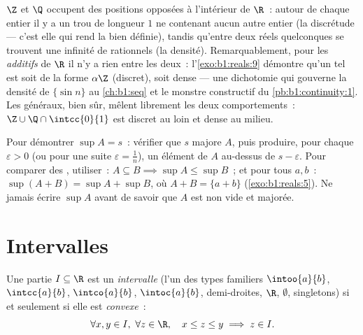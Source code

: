 \begin{remark}
$\Z$ et $\Q$ occupent des positions opposées à l'intérieur de
$\R$~: autour de chaque entier il y a un trou de longueur $1$ ne
contenant aucun autre entier (la discrétude --- c'est elle qui rend
la  bien définie), tandis qu'entre deux réels
quelconques se trouvent une infinité de rationnels (la densité).
Remarquablement, pour les \emph{ additifs} de $\R$ il
n'y a rien entre les deux~: l'\cref{exo:b1:reals:9} démontre qu'un
tel  est soit de la forme $\alpha\Z$ (discret), soit
dense --- une dichotomie qui gouverne la densité de $\{\sin n\}$ au
\cref{ch:b1:seq} et le monstre constructif du
\cref{pb:b1:continuity:1}. Les  généraux, bien sûr, mêlent
librement les deux comportements~: $\Z \cup \Q\cap\intcc{0}{1}$ est
discret au loin et dense au milieu.
\end{remark}

\begin{method}\label{met:b1:reals:supproofs}
Pour démontrer $\sup A = s$~: vérifier que $s$ majore $A$, puis
produire, pour chaque $\varepsilon > 0$ (ou pour une suite
$\varepsilon = \frac 1n$), un élément de $A$ au-dessus de $s -
\varepsilon$. Pour comparer des , utiliser~: $A
\subseteq B \implies \sup A \leq \sup B$~; et pour tous $a, b$~:
$\sup(A + B) = \sup A + \sup B$, où $A + B = \{a + b\}$
(\cref{exo:b1:reals:5}). Ne jamais écrire $\sup A$ avant de savoir
que $A$ est non vide et majorée.
\end{method}

\section{Intervalles}

\begin{proposition}\label{prop:b1:reals:intervals}
Une partie $I \subseteq \R$ est un \emph{intervalle}
(l'un des types familiers $\intoo{a}{b}$, $\intcc{a}{b}$,
$\intco{a}{b}$, $\intoc{a}{b}$, demi-droites, $\R$, $\emptyset$,
singletons) si et seulement si elle est \emph{convexe}~:
\[
\forall x, y \in I,\ \forall z \in \R, \quad
x \leq z \leq y \implies z \in I .
\]
\end{proposition}

